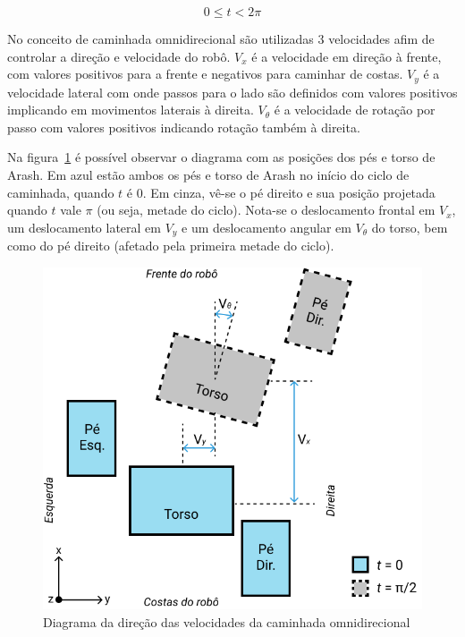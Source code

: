 \begin{equation}
	\label{eq:math:centraclock}
	0 \leq t < 2\pi
\end{equation}

No conceito de caminhada omnidirecional são utilizadas 3 velocidades afim de controlar a direção e velocidade do robô. $V_x$ é a velocidade em direção à frente, com valores positivos para a frente e negativos para caminhar de costas. $V_y$ é a velocidade lateral com onde passos para o lado são definidos com valores positivos implicando em movimentos laterais à direita. $V_\theta$ é a velocidade de rotação por passo com valores positivos indicando rotação também à direita.

Na figura~\ref{fig:math:velocities} é possível observar o diagrama com as posições dos pés e torso de Arash. Em azul estão ambos os pés e torso de Arash no início do ciclo de caminhada, quando $t$ é $0$. Em cinza, vê-se o pé direito e sua posição projetada quando $t$ vale $\pi$ (ou seja, metade do ciclo). Nota-se o deslocamento frontal em $V_x$, um deslocamento lateral em $V_y$ e um deslocamento angular em $V_\theta$ do torso, bem como do pé direito (afetado pela primeira metade do ciclo).

\begin{figure}[htb]
	\centering
	\includegraphics[scale=1]{imagens/svg/velocities-diagram}
	\caption{Diagrama da direção das velocidades da caminhada omnidirecional}
	\label{fig:math:velocities}
\end{figure}

